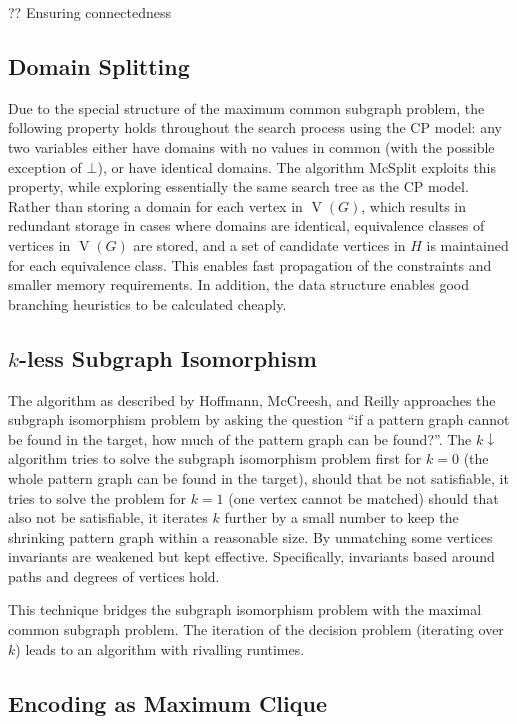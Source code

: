 \documentclass[sigconf]{acmart}
\begin{document}
?? Ensuring connectedness

\subsection{Domain Splitting}

Due to the special structure of the maximum common subgraph problem, the following property holds
throughout the search process using the CP model: any two variables either have domains with no
values in common (with the possible exception of $\bot$), or have identical domains. The algorithm
McSplit exploits this property, while exploring essentially the same search tree as the CP model.
Rather than storing a domain for each vertex in $\operatorname{V}(G)$, which results in redundant
storage in cases where domains are identical, equivalence classes of vertices in
$\operatorname{V}(G)$ are stored, and a set of candidate vertices in $H$ is maintained for each
equivalence class. This enables fast propagation of the constraints and smaller memory requirements.
In addition, the data structure enables good branching heuristics to be calculated cheaply.

\subsection{$k$-less Subgraph Isomorphism}

The algorithm as described by Hoffmann, McCreesh, and Reilly \cite{DBLP:conf/aaai/HoffmannMR17} approaches the subgraph isomorphism problem by asking the question ``if a pattern graph cannot be found in the target, how much of the pattern graph can be found?''. The $k{\downarrow}$ algorithm tries to solve the subgraph isomorphism problem first for $k=0$ (the whole pattern graph can be found in the target), should that be not satisfiable, it tries to solve the problem for $k=1$ (one vertex cannot be matched) should that also not be satisfiable, it iterates $k$ further by a small number to keep the shrinking pattern graph within a reasonable size. By unmatching some vertices  invariants are weakened but kept effective. Specifically, invariants based around paths and degrees of vertices hold.

This technique bridges the subgraph isomorphism problem with the maximal common subgraph problem. The iteration of the decision problem (iterating over $k$) leads to an algorithm with rivalling runtimes.

\subsection{Encoding as Maximum Clique}
\end{document}
